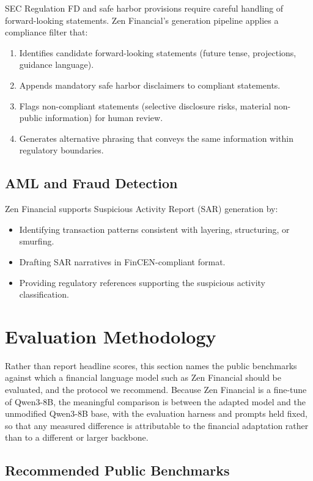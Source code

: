\documentclass[11pt,a4paper]{article}
\begin{document}
SEC Regulation FD and safe harbor provisions require careful handling of forward-looking statements. Zen Financial's generation pipeline applies a compliance filter that:

\begin{enumerate}
  \item Identifies candidate forward-looking statements (future tense, projections, guidance language).
  \item Appends mandatory safe harbor disclaimers to compliant statements.
  \item Flags non-compliant statements (selective disclosure risks, material non-public information) for human review.
  \item Generates alternative phrasing that conveys the same information within regulatory boundaries.
\end{enumerate}

\subsection{AML and Fraud Detection}

Zen Financial supports Suspicious Activity Report (SAR) generation by:
\begin{itemize}
  \item Identifying transaction patterns consistent with layering, structuring, or smurfing.
  \item Drafting SAR narratives in FinCEN-compliant format.
  \item Providing regulatory references supporting the suspicious activity classification.
\end{itemize}

\section{Evaluation Methodology}

Rather than report headline scores, this section names the public benchmarks against which a financial language model such as Zen Financial should be evaluated, and the protocol we recommend. Because Zen Financial is a fine-tune of Qwen3-8B, the meaningful comparison is between the adapted model and the unmodified Qwen3-8B base, with the evaluation harness and prompts held fixed, so that any measured difference is attributable to the financial adaptation rather than to a different or larger backbone.

\subsection{Recommended Public Benchmarks}
\end{document}
